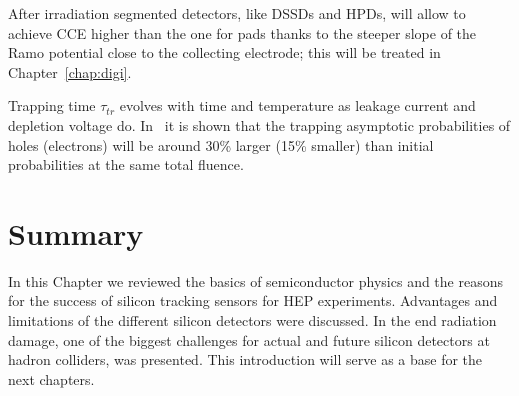 After irradiation segmented detectors, like DSSDs and HPDs, will allow to achieve CCE higher than 
the one for pads thanks to the steeper slope of the Ramo potential close to the collecting electrode; 
this will be treated in Chapter~\ref{chap:digi}.

Trapping time $\tau_{tr}$ evolves with time and temperature as leakage current and depletion voltage 
do. In~\cite{KRAMBERGER2007762} it is shown that the trapping asymptotic probabilities  of
holes (electrons) will be around 30\% larger (15\% smaller)
than initial probabilities at the same total fluence.

\section{Summary}
\label{sec:SiliconSummary}

In this Chapter we reviewed the basics of semiconductor physics and the reasons for the 
success of silicon tracking sensors for HEP experiments. Advantages and limitations of the 
different silicon detectors were discussed. In the end radiation damage, one of the biggest challenges for 
actual and future silicon detectors at hadron colliders, was presented.
This introduction will serve as a base for the next chapters.


   
